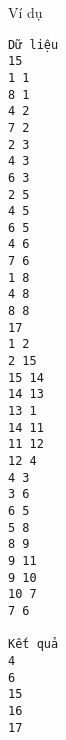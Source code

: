 Ví dụ
\begin{verbatim}
Dữ liệu
15
1 1
8 1
4 2
7 2
2 3
4 3
6 3
2 5
4 5
6 5
4 6
7 6
1 8
4 8
8 8
17
1 2
2 15
15 14
14 13
13 1
14 11
11 12
12 4
4 3
3 6
6 5
5 8
8 9
9 11
9 10
10 7
7 6

Kết quả
4
6
15
16
17
\end{verbatim}